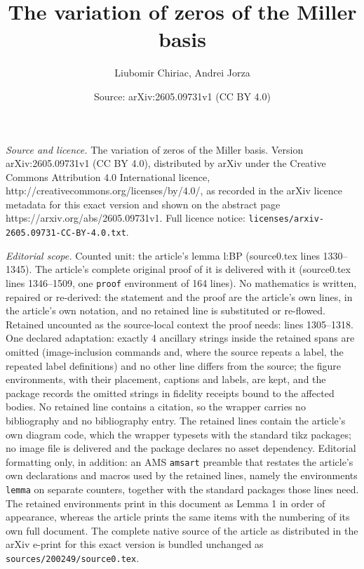 \documentclass[10pt,a4paper]{amsart}
\title{The variation of zeros of the Miller basis}
\author{Liubomir Chiriac, Andrei Jorza}
\date{Source: arXiv:2605.09731v1 (CC BY 4.0)}
\begin{document}
\maketitle

\noindent\emph{Source and licence.} The variation of zeros of the Miller basis. Version arXiv:2605.09731v1 (CC BY 4.0), distributed by arXiv under the Creative Commons Attribution 4.0 International licence, http://creativecommons.org/licenses/by/4.0/, as recorded in the arXiv licence metadata for this exact version and shown on the abstract page https://arxiv.org/abs/2605.09731v1. Full licence notice: \texttt{licenses/arxiv-2605.09731-CC-BY-4.0.txt}.\par\smallskip

\noindent\textit{Editorial scope.} Counted unit: the article's lemma l:BP (source0.tex lines 1330--1345). The article's complete original proof of it is delivered with it (source0.tex lines 1346--1509, one \texttt{proof} environment of 164 lines). No mathematics is written, repaired or re-derived: the statement and the proof are the article's own lines, in the article's own notation, and no retained line is substituted or re-flowed.  Retained uncounted as the source-local context the proof needs: lines 1305--1318.  One declared adaptation: exactly 4 ancillary strings inside the retained spans are omitted (image-inclusion commands and, where the source repeats a label, the repeated label definitions) and no other line differs from the source; the figure environments, with their placement, captions and labels, are kept, and the package records the omitted strings in fidelity receipts bound to the affected bodies.  No retained line contains a citation, so the wrapper carries no bibliography and no bibliography entry.  The retained lines contain the article's own diagram code, which the wrapper typesets with the standard tikz packages; no image file is delivered and the package declares no asset dependency.  Editorial formatting only, in addition: an AMS \texttt{amsart} preamble that restates the article's own declarations and macros used by the retained lines, namely the environments \texttt{lemma} on separate counters, together with the standard packages those lines need.  The retained environments print in this document as Lemma 1 in order of appearance, whereas the article prints the same items with the numbering of its own full document.  The complete native source of the article as distributed in the arXiv e-print for this exact version is bundled unchanged as \texttt{sources/200249/source0.tex}.
\end{document}
